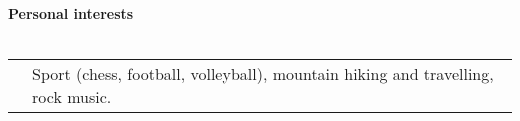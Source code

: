\textbf{Personal interests}
\\
\\
\begin{tabular}{p{}|p{}}
&Sport (chess, football, volleyball), mountain hiking and travelling, rock music.\\
\end{tabular}